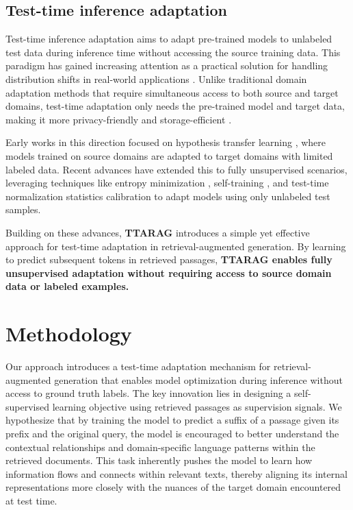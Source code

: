 \documentclass{article}
\newcommand{\ourmethod}{{\fontfamily{lmtt}\selectfont \textbf{TTARAG}}\xspace}
\begin{document}
\subsection{Test-time inference adaptation}

Test-time inference adaptation aims to adapt pre-trained models to unlabeled test data during inference time without accessing the source training data. This paradigm has gained increasing attention as a practical solution for handling distribution shifts in real-world applications \cite{wang2021tent, boudiaf2022parameter}. Unlike traditional domain adaptation methods that require simultaneous access to both source and target domains, test-time adaptation only needs the pre-trained model and target data, making it more privacy-friendly and storage-efficient \cite{liang2020we}.

Early works in this direction focused on hypothesis transfer learning \cite{kuzborskij2013stability}, where models trained on source domains are adapted to target domains with limited labeled data. Recent advances have extended this to fully unsupervised scenarios, leveraging techniques like entropy minimization \cite{wang2021tent}, self-training \cite{sun2020test}, and test-time normalization statistics calibration \cite{schneider2020improving} to adapt models using only unlabeled test samples. 

Building on these advances, \ourmethod introduces a simple yet effective approach for test-time adaptation in retrieval-augmented generation. By learning to predict subsequent tokens in retrieved passages, \textbf{\ourmethod enables fully unsupervised adaptation without requiring access to source domain data or labeled examples.}



\section{Methodology}
Our approach introduces a test-time adaptation mechanism for retrieval-augmented generation that enables model optimization during inference without access to ground truth labels. The key innovation lies in designing a self-supervised learning objective using retrieved passages as supervision signals. We hypothesize that by training the model to predict a suffix of a passage given its prefix and the original query, the model is encouraged to better understand the contextual relationships and domain-specific language patterns within the retrieved documents. This task inherently pushes the model to learn how information flows and connects within relevant texts, thereby aligning its internal representations more closely with the nuances of the target domain encountered at test time.
\end{document}
